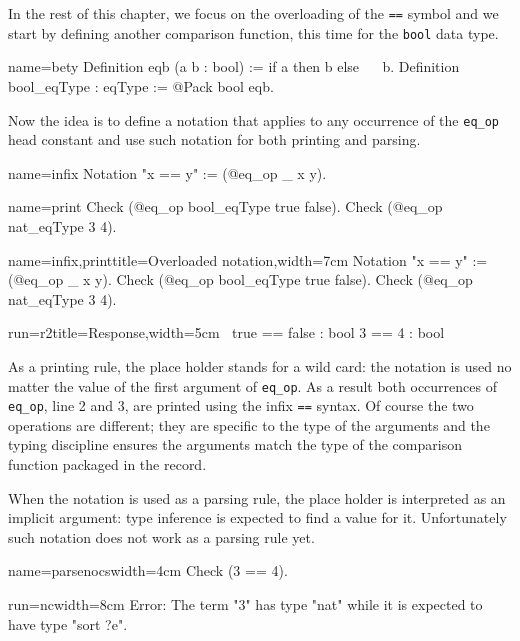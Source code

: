 In the rest of this chapter, we focus on the overloading of the
\lstinline/==/ symbol and we start by defining another comparison
function, this time for the \lstinline/bool/ data type.

\begin{coq}{name=bety}{}
Definition eqb (a b : bool) := if a then b else ~~ b.
Definition bool_eqType : eqType := @Pack bool eqb.
\end{coq}

Now the idea is to define a notation that applies to any occurrence
of the \lstinline/eq_op/ head constant and use such
notation for both printing and parsing.

\begin{coqdef}{name=infix}
Notation "x == y" := (@eq_op _ x y).
\end{coqdef}
\begin{coqdef}{name=print}
Check (@eq_op bool_eqType true false).
Check (@eq_op nat_eqType 3 4).
\end{coqdef}
\begin{coq-left}{name=infix,print}{title=Overloaded notation,width=7cm}
Notation "x == y" := (@eq_op _ x y).
Check (@eq_op bool_eqType true false).
Check (@eq_op nat_eqType 3 4).
\end{coq-left}
\begin{coqout-right}{run=r2}{title=Response,width=5cm}
$~$
true == false : bool
3 == 4 : bool
\end{coqout-right}

As a printing rule, the place holder stands for a wild card: the
notation is used no matter the value of the first argument of
\lstinline/eq_op/.  As a result both occurrences of \lstinline/eq_op/,
line 2 and 3, are printed using the infix \lstinline/==/ syntax.
Of course the two operations are different; they are specific to the
type of the arguments and the typing discipline ensures the
arguments match the type of the comparison function packaged in
the record.

When the notation is used as a parsing rule, the place holder is
interpreted as an implicit argument: type inference is expected to find a value
for it.  Unfortunately such notation does not work as a parsing rule
yet.

\begin{coq-left}{name=parsenocs}{width=4cm}
Check (3 == 4).
$~$
\end{coq-left}
\begin{coqout-right}{run=nc}{width=8cm}
Error: The term "3" has type "nat" while
it is expected to have type "sort ?e".
\end{coqout-right}

